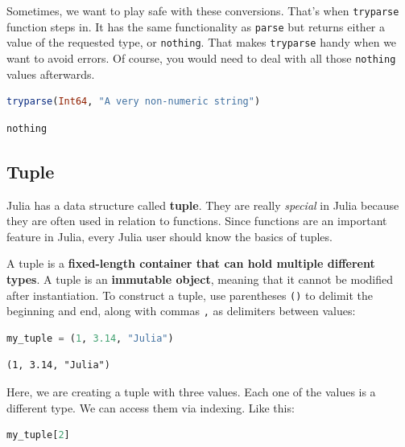 \documentclass[
  notoc %
]{tufte-book}
\newcommand{\passthrough}[1]{#1}
\begin{document}
Sometimes, we want to play safe with these conversions. That's when
\passthrough{\lstinline!tryparse!} function steps in. It has the same
functionality as \passthrough{\lstinline!parse!} but returns either a
value of the requested type, or \passthrough{\lstinline!nothing!}. That
makes \passthrough{\lstinline!tryparse!} handy when we want to avoid
errors. Of course, you would need to deal with all those
\passthrough{\lstinline!nothing!} values afterwards.

\begin{lstlisting}[language=Julia]
tryparse(Int64, "A very non-numeric string")
\end{lstlisting}

\begin{lstlisting}[language=Output]
nothing
\end{lstlisting}

\hypertarget{sec:tuple}{%
\subsection{Tuple}\label{sec:tuple}}

Julia has a data structure called \textbf{tuple}. They are really
\emph{special} in Julia because they are often used in relation to
functions. Since functions are an important feature in Julia, every
Julia user should know the basics of tuples.

A tuple is a \textbf{fixed-length container that can hold multiple
different types}. A tuple is an \textbf{immutable object}, meaning that
it cannot be modified after instantiation. To construct a tuple, use
parentheses \passthrough{\lstinline!()!} to delimit the beginning and
end, along with commas \passthrough{\lstinline!,!} as delimiters between
values:

\begin{lstlisting}[language=Julia]
my_tuple = (1, 3.14, "Julia")
\end{lstlisting}

\begin{lstlisting}[language=Output]
(1, 3.14, "Julia")
\end{lstlisting}

Here, we are creating a tuple with three values. Each one of the values
is a different type. We can access them via indexing. Like this:

\begin{lstlisting}[language=Julia]
my_tuple[2]
\end{lstlisting}
\end{document}

